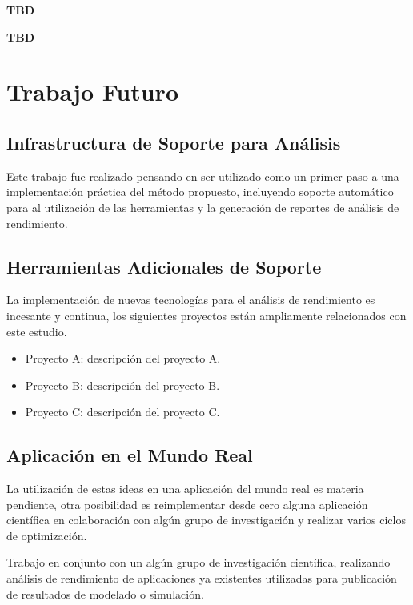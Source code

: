\documentclass[a4paper]{report}
\begin{document}
{\bf TBD}

\bigskip

{\bf TBD}

\chapter{Trabajo Futuro}

\section{Infrastructura de Soporte para An\'alisis}

Este trabajo fue realizado pensando en ser utilizado como un primer paso
a una implementaci\'on pr\'actica del m\'etodo propuesto, incluyendo soporte
autom\'atico para al utilizaci\'on de las herramientas y la generaci\'on de
reportes de an\'alisis de rendimiento.

\section{Herramientas Adicionales de Soporte}

La implementaci\'on de nuevas tecnolog\'ias para el an\'alisis de rendimiento
es incesante y continua, los siguientes proyectos est\'an ampliamente
relacionados con este estudio.

\begin{itemize}
\item Proyecto A: descripci\'on del proyecto A.
\item Proyecto B: descripci\'on del proyecto B.
\item Proyecto C: descripci\'on del proyecto C.
\end{itemize}

\section{Aplicaci\'on en el Mundo Real}

La utilizaci\'on de estas ideas en una aplicaci\'on del mundo real es materia
pendiente, otra posibilidad es reimplementar desde cero alguna aplicaci\'on
cient\'ifica en colaboraci\'on con alg\'un grupo de investigaci\'on y realizar
varios ciclos de optimizaci\'on.

\bigskip

Trabajo en conjunto con un alg\'un grupo de investigaci\'on cient\'ifica,
realizando an\'alisis de rendimiento de aplicaciones ya existentes utilizadas
para publicaci\'on de resultados de modelado o simulaci\'on.
\end{document}
